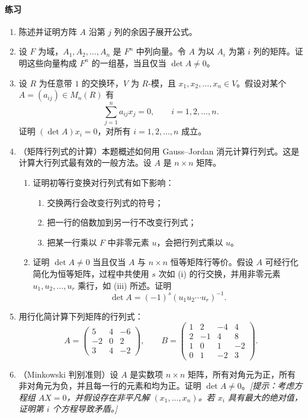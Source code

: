 \paragraph{练习}
\begin{enumerate}[label=\arabic*.]
\item 陈述并证明方阵 $A$ 沿第 $j$ 列的余因子展开公式。
\item 设 $F$ 为域，$A_1,A_2,\ldots,A_n$ 是 $F^n$ 中列向量。令 $A$ 为以 $A_i$ 为第 $i$ 列的矩阵。证明这些向量构成 $F^n$ 的一组基，当且仅当 $\det A\neq0$。
\item 设 $R$ 为任意带 $1$ 的交换环，$V$ 为 $R$-模，且 $x_1,x_2,\ldots,x_n\in V$。假设对某个 $A=(a_{ij})\in M_n(R)$ 有
\[
\sum_{j=1}^n a_{ij}x_j=0,
\qquad i=1,2,\ldots,n.
\]
证明 $(\det A)x_i=0$，对所有 $i=1,2,\ldots,n$ 成立。
\item （矩阵行列式的计算）本题概述如何用 Gauss--Jordan 消元计算行列式。这是计算大行列式最有效的一般方法。设 $A$ 是 $n\times n$ 矩阵。
\begin{enumerate}[label=(\alph*)]
\item 证明初等行变换对行列式有如下影响：
\begin{enumerate}[label=(\roman*)]
\item 交换两行会改变行列式的符号；
\item 把一行的倍数加到另一行不改变行列式；
\item 把某一行乘以 $F$ 中非零元素 $u$，会把行列式乘以 $u$。
\end{enumerate}
\item 证明 $\det A\neq0$ 当且仅当 $A$ 与 $n\times n$ 恒等矩阵行等价。假设 $A$ 可经行化简化为恒等矩阵，过程中共使用 $s$ 次如 (i) 的行交换，并用非零元素 $u_1,u_2,\ldots,u_r$ 乘行，如 (iii) 所述。证明
\[
\det A=(-1)^s(u_1u_2\cdots u_r)^{-1}.
\]
\end{enumerate}
\item 用行化简计算下列矩阵的行列式：
\[
A=\begin{pmatrix}5&4&-6\\-2&0&2\\3&4&-2\end{pmatrix},
\qquad
B=\begin{pmatrix}1&2&-4&4\\2&-1&4&8\\1&0&1&-2\\0&1&-2&3\end{pmatrix}.
\]
\item （Minkowski 判别准则）设 $A$ 是实数项 $n\times n$ 矩阵，所有对角元为正，所有非对角元为负，并且每一行的元素和均为正。证明 $\det A\neq0$。\emph{[提示：考虑方程组 $AX=0$，并假设存在非平凡解 $(x_1,\ldots,x_n)$。若 $x_i$ 具有最大的绝对值，证明第 $i$ 个方程导致矛盾。]}
\end{enumerate}

